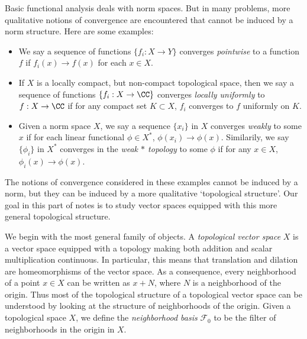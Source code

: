 Basic functional analysis deals with norm spaces. But in many problems, more qualitative notions of convergence are encountered that cannot be induced by a norm structure. Here are some examples:
%
\begin{itemize}
    \item We say a sequence of functions $\{ f_i: X \to Y \}$ converges \emph{pointwise} to a function $f$ if $f_i(x) \to f(x)$ for each $x \in X$.

    \item If $X$ is a locally compact, but non-compact topological space, then we say a sequence of functions $\{ f_i: X \to \CC \}$ converges \emph{locally uniformly} to $f: X \to \CC$ if for any compact set $K \subset X$, $f_i$ converges to $f$ uniformly on $K$.

    \item Given a norm space $X$, we say a sequence $\{ x_i \}$ in $X$ converges \emph{weakly} to some $x$ if for each linear functional $\phi \in X^*$, $\phi(x_i) \to \phi(x)$. Similarily, we say $\{ \phi_i \}$ in $X^*$ converges in the \emph{weak $*$ topology} to some $\phi$ if for any $x \in X$, $\phi_i(x) \to \phi(x)$.
\end{itemize}
%
The notions of convergence considered in these examples cannot be induced by a norm, but they can be induced by a more qualitative `topological structure'. Our goal in this part of notes is to study vector spaces equipped with this more general topological structure.

We begin with the most general family of objects.
A \emph{topological vector space} $X$ is a vector space equipped with a topology making both addition and scalar multiplication continuous.
In particular, this means that translation and dilation are homeomorphisms of the vector space.
As a consequence, every neighborhood of a point $x \in X$ can be written as $x + N$, where $N$ is a neighborhood of the origin. Thus most of the topological structure of a topological vector space can be understood by looking at the structure of neighborhoods of the origin. Given a topological space $X$, we define the \emph{neighborhood basis} $\mathcal{F}_0$ to be the filter of neighborhoods in the origin in $X$.

